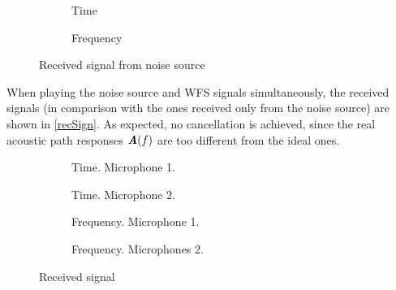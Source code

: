 \begin{figure}
	\begin{subfigure}[b]{0.49\textwidth}
		\centering
		\def\svgwidth{0.9\columnwidth}
		\graphicspath{{Img/}}
		{\fontsize{5}{12}\selectfont
			
		}
		\caption{Time}
	\end{subfigure}
	\begin{subfigure}[b]{0.49\textwidth}
		\centering
		\def\svgwidth{0.9\columnwidth}
		\graphicspath{{Img/}}
		{\fontsize{5}{12}\selectfont
			
		}
		\caption{Frequency}
	\end{subfigure}
	\caption{Received signal from noise source}
	\label{recNS}
\end{figure}

When playing the noise source and WFS signals simultaneously, the received signals (in comparison with the ones received only from the noise source) are shown in \autoref{recSign}. As expected, no cancellation is achieved, since the real acoustic path responses $\AcPath[mat](f)$ are too different from the ideal ones.
\begin{figure}[h]
	\begin{subfigure}[b]{0.49\textwidth}
		\centering
		\def\svgwidth{0.9\columnwidth}
		\graphicspath{{Img/}}
		{\fontsize{5}{12}\selectfont
			
		}
		\caption{Time. Microphone 1.}
	\end{subfigure}
	\begin{subfigure}[b]{0.49\textwidth}
		\centering
		\def\svgwidth{0.9\columnwidth}
		\graphicspath{{Img/}}
		{\fontsize{5}{12}\selectfont
			
		}
		\caption{Time. Microphone 2.}
	\end{subfigure}
	\begin{subfigure}[b]{0.49\textwidth}
		\centering
		\def\svgwidth{0.9\columnwidth}
		\graphicspath{{Img/}}
		{\fontsize{5}{12}\selectfont
			
		}
		\caption{Frequency. Microphone 1.}
	\end{subfigure}
	\begin{subfigure}[b]{0.49\textwidth}
		\centering
		\def\svgwidth{0.9\columnwidth}
		\graphicspath{{Img/}}
		{\fontsize{5}{12}\selectfont
			
		}
		\caption{Frequency. Microphones 2.}
	\end{subfigure}
	\caption{Received signal}
	\label{recSign}
\end{figure}


